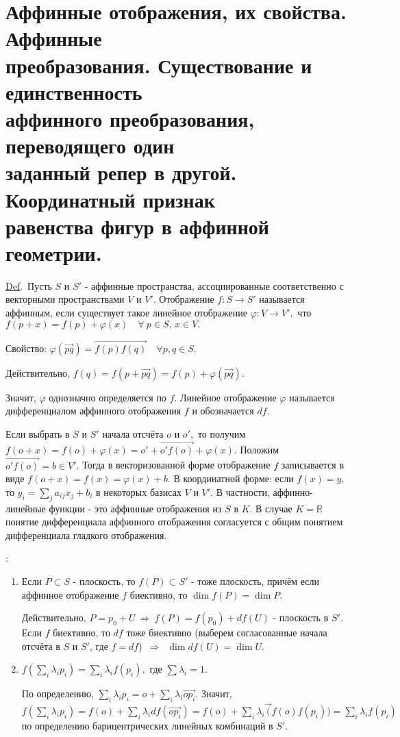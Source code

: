 \documentclass[a4paper]{article}%
\renewcommand{\de}{\par\noindent\underline{Def}.\ }%
\renewcommand{\ab}{\par\noindent}%
\renewcommand{\phi}{\varphi}
\newcommand{\oi}[1]{\overrightarrow{#1}}%
\begin{document}
\section{Аффинные отображения, их свойства. Аффинные\\ преобразования. Существование и единственность\\ аффинного преобразования, переводящего один\\ заданный репер в другой.
Координатный признак\\ равенства фигур в аффинной геометрии.} %
\label{q42}%
\de Пусть $S$ и $S'$ - аффинные пространства, ассоциированные соответственно с векторными пространствами $V$ и $V'$. Отображение
$f:S\rightarrow S'$ называется аффинным, если существует такое линейное отображение $\phi:V\rightarrow V',$ что
$f(p+x)=f(p)+\phi(x)\quad\forall\ p\in S,\, x\in V.$
\ab Свойство: $\phi(\oi{pq})=\oi{f(p)f(q)}\quad\forall p,q\in S.$
\ab Действительно, $f(q)=f(p+\oi{pq})=f(p)+\phi(\oi{pq}).$
\ab Значит, $\phi$ однозначно определяется по $f$. Линейное отображение $\phi$ называется дифференциалом аффинного отображения $f$
и обозначается $df$.
\ab Если выбрать в $S$ и $S'$ начала отсчёта $o$ и $o',$ то получим $f(o+x)=f(o)+\phi(x)=o'+\oi{o'f(o)}+\phi(x).$ Положим $\oi{o'f(o)}=b\in V'.$
Тогда в векторизованной форме отображение $f$ записывается в виде $f(o+x)=f(x)=\phi(x)+b.$ В координатной форме: если $f(x)=y,$ то
$y_i=\sum\limits_ja_{ij}x_j+b_i$ в некоторых базисах $V$ и $V'$. В частности, аффинно-линейные функции - это аффинные отображения
из $S$ в $K$. В случае $K=\mathbb{R}$ понятие дифференциала аффинного отображения согласуется с общим понятием дифференциала
гладкого отображения.
\ab{\bf Свойства аффинного отображения}:
\begin{enumerate}
    \item Если $P\subset S$ - плоскость, то $f(P)\subset S'$ - тоже плоскость, причём если аффинное отображение $f$ биективно, то $\dim f(P)=\dim P.$
    \ab Действительно, $P=p_0+U\ \Rightarrow\ f(P)=f(p_0)+df(U)$ - плоскость в $S'.$\\ Если $f$ биективно, то $df$ тоже биективно
    (выберем согласованные начала отсчёта в $S$ и $S'$, где $f=df$)\ $\Rightarrow$\ $\dim df(U)=\dim U.$
    \item $f\left(\sum\limits_i\lambda_ip_i\right)=\sum\limits_i\lambda_if(p_i),$ где $\sum\lambda_i=1.$
    \ab По определению, $\sum\limits_i\lambda_ip_i=o+\sum\limits_i\lambda_i\oi{op_i}.$ Значит,\\ $f\left(\sum\limits_i\lambda_ip_i\right)=f(o)+
    \sum\limits_i\lambda_idf(\oi{op_i})=f(o)+\sum\limits_i\lambda_i\oi(f(o)f(p_i))=\sum\limits_i\lambda_if(p_i)$\\ по определению
    барицентрических линейных комбинаций в $S'.$
\end{enumerate}
\end{document}
